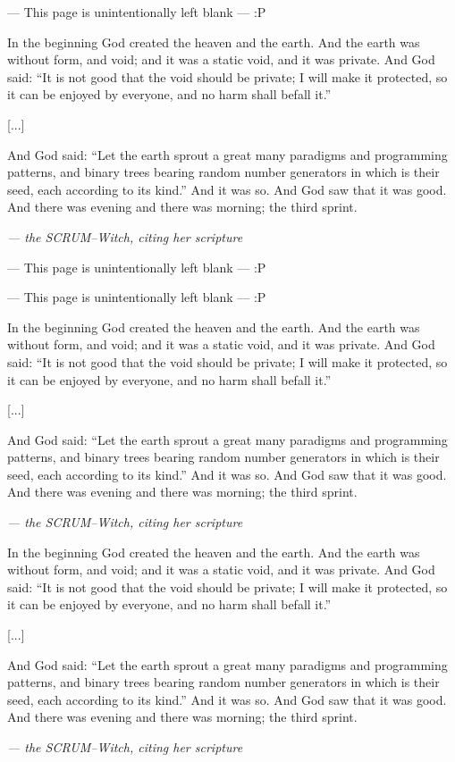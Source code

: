 
\newcommand\scrumwitch{
	\thispagestyle{empty}
	\hbox{}
	\vfill
	\begin{center}
	\begin{minipage}{.7\textwidth}
	\centering
	In the beginning God created the heaven and the earth.
	And the earth was without form, and void;
	 and it was a static void, and it was private.
	And God said: \enquote{It is not good that the void should be private;
	 I will make it protected,
	 so it can be enjoyed by everyone, and no harm shall befall it.}

	[...]

	And God said: \enquote{Let the earth sprout a great many paradigms and programming patterns,
	 and binary trees bearing random number generators in which is their seed,
	 each according to its kind.}
	And it was so.
	And God saw that it was good.
	And there was evening and there was morning; the third sprint.
	\end{minipage}
	\end{center}

	\hfill\textit{--- the SCRUM--Witch, citing her scripture}
	\vfill
}

\newcommand\unintentional{
	\hbox{}
	\vspace{5mm}
	\begin{center}
	\tiny
	--- This page is unintentionally left blank ---
	\vfill
	:P
	\end{center}
}

\ifcase\numexpr {} \relax
\or

\unintentional
\newpage
\scrumwitch
\newpage
\thispagestyle{empty}
\unintentional
\or
\thispagestyle{empty}
\unintentional
\newpage
\scrumwitch
\or
\scrumwitch
\fi
